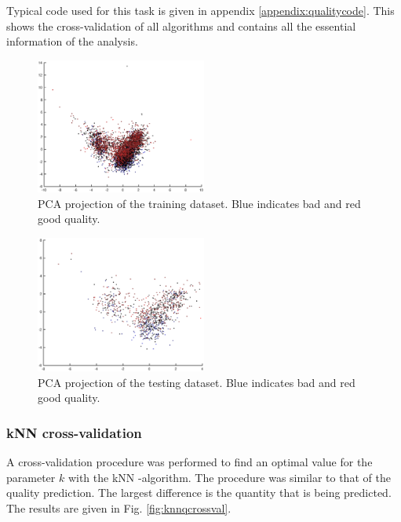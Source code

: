 \documentclass[twoside]{article}
\begin{document}
\begin{multicols}{2}
Typical code used for this task is given in appendix \ref{appendix:qualitycode}. This shows the cross-validation of all algorithms and
contains all the essential information of the analysis.

\begin{figure}[H]
\centering
\includegraphics[width=0.5\textwidth]{qpcatraining}
\caption{PCA projection of the training dataset. Blue indicates bad and red good quality.}
\label{fig:quality_training_pca}
\end{figure}

\begin{figure}[H]
\centering
\includegraphics[width=0.5\textwidth]{qpcatesting}
\caption{PCA projection of the testing dataset. Blue indicates bad and red good quality.}
\label{fig:quality_testing_pca}
\end{figure}

\subsubsection{kNN cross-validation}

A cross-validation procedure was performed to find an optimal value for the parameter $k$ with the 
kNN -algorithm. The procedure was similar to that of the quality prediction. The largest difference is
the quantity that is being predicted. The results are given in
Fig. \ref{fig:knnqcrossval}.


\end{multicols}
\end{document}
